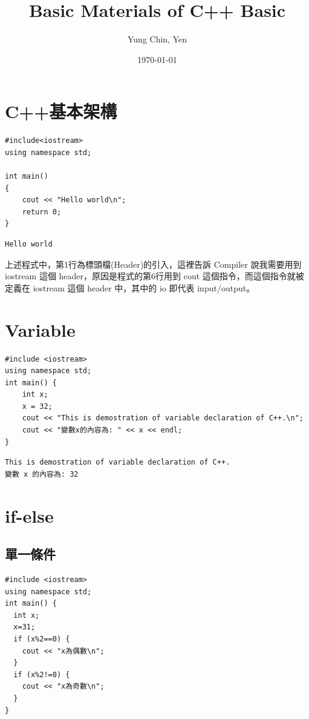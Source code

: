 \documentclass[12pt,a4paper]{article}
\author{Yung Chin, Yen}
\date{\today}
\title{Basic Materials of C++ Basic}
\begin{document}
\maketitle
\tableofcontents

\newpage

\section{C++基本架構}
\label{sec:orgd5dc298}

\lstset{breaklines=true,language=cpp,label= ,caption= ,captionpos=b,firstnumber=1,numbers=left}
\begin{lstlisting}
#include<iostream>
using namespace std;

int main()
{
    cout << "Hello world\n";
    return 0;
}
\end{lstlisting}

\begin{verbatim}
Hello world
\end{verbatim}


上述程式中，第1行為標頭檔(Header)的引入，這裡告訴 Compiler 說我需要用到 iostream 這個 header，原因是程式的第6行用到 cout 這個指令，而這個指令就被定義在 iostream 這個 header 中，其中的 io 即代表 input/output。\\
\section{Variable}
\label{sec:org768402c}

\lstset{breaklines=true,language=C++,label= ,caption= ,captionpos=b,firstnumber=1,numbers=left}
\begin{lstlisting}
#include <iostream>
using namespace std;
int main() {
    int x;
    x = 32;
    cout << "This is demostration of variable declaration of C++.\n";
    cout << "變數x的內容為: " << x << endl;
}
\end{lstlisting}

\begin{verbatim}
This is demostration of variable declaration of C++.
變數 x 的內容為: 32
\end{verbatim}

\section{if-else}
\label{sec:org4f10f8c}

\subsection{單一條件}
\label{sec:org68d0037}
\lstset{breaklines=true,language=cpp,label= ,caption= ,captionpos=b,firstnumber=1,numbers=left}
\begin{lstlisting}
#include <iostream>
using namespace std;
int main() {
  int x;
  x=31;
  if (x%2==0) {
    cout << "x為偶數\n";
  }
  if (x%2!=0) {
    cout << "x為奇數\n";
  }
}
\end{lstlisting}
\end{document}
